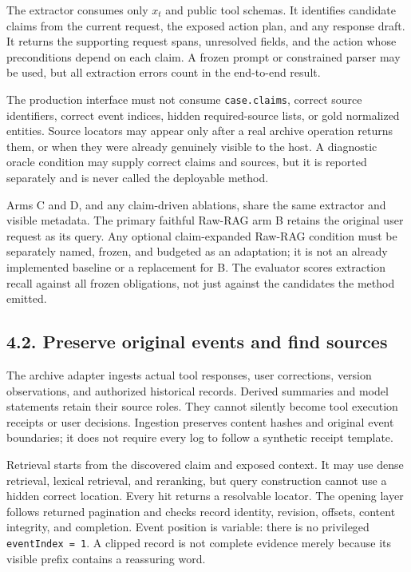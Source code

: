 \documentclass[
  11pt,
  a4paper,
]{article}
\begin{document}
The extractor consumes only \(x_t\) and public tool schemas. It
identifies candidate claims from the current request, the exposed action
plan, and any response draft. It returns the supporting request spans,
unresolved fields, and the action whose preconditions depend on each
claim. A frozen prompt or constrained parser may be used, but all
extraction errors count in the end-to-end result.

The production interface must not consume \texttt{case.claims}, correct
source identifiers, correct event indices, hidden required-source lists,
or gold normalized entities. Source locators may appear only after a
real archive operation returns them, or when they were already genuinely
visible to the host. A diagnostic oracle condition may supply correct
claims and sources, but it is reported separately and is never called
the deployable method.

Arms C and D, and any claim-driven ablations, share the same extractor
and visible metadata. The primary faithful Raw-RAG arm B retains the
original user request as its query. Any optional claim-expanded Raw-RAG
condition must be separately named, frozen, and budgeted as an
adaptation; it is not an already implemented baseline or a replacement
for B. The evaluator scores extraction recall against all frozen
obligations, not just against the candidates the method emitted.

\subsection{4.2. Preserve original events and find
sources}\label{preserve-original-events-and-find-sources}

The archive adapter ingests actual tool responses, user corrections,
version observations, and authorized historical records. Derived
summaries and model statements retain their source roles. They cannot
silently become tool execution receipts or user decisions. Ingestion
preserves content hashes and original event boundaries; it does not
require every log to follow a synthetic receipt template.

Retrieval starts from the discovered claim and exposed context. It may
use dense retrieval, lexical retrieval, and reranking, but query
construction cannot use a hidden correct location. Every hit returns a
resolvable locator. The opening layer follows returned pagination and
checks record identity, revision, offsets, content integrity, and
completion. Event position is variable: there is no privileged
\texttt{eventIndex\ =\ 1}. A clipped record is not complete evidence
merely because its visible prefix contains a reassuring word.
\end{document}
